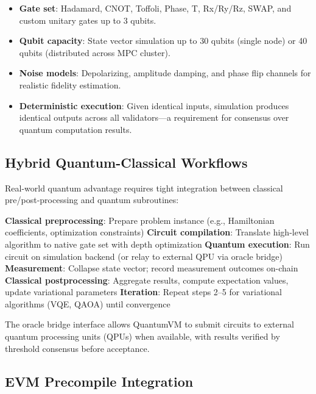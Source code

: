 \documentclass[11pt,letterpaper]{article}
\begin{document}
\begin{itemize}
\item \textbf{Gate set}: Hadamard, CNOT, Toffoli, Phase, T, Rx/Ry/Rz, SWAP, and custom unitary gates up to 3 qubits.
\item \textbf{Qubit capacity}: State vector simulation up to 30 qubits (single node) or 40 qubits (distributed across MPC cluster).
\item \textbf{Noise models}: Depolarizing, amplitude damping, and phase flip channels for realistic fidelity estimation.
\item \textbf{Deterministic execution}: Given identical inputs, simulation produces identical outputs across all validators---a requirement for consensus over quantum computation results.
\end{itemize}

\subsection{Hybrid Quantum-Classical Workflows}

Real-world quantum advantage requires tight integration between classical pre/post-processing and quantum subroutines:

\begin{algorithm}[H]
\caption{Hybrid Quantum-Classical Execution on QuantumVM}
\begin{algorithmic}[1]
\State \textbf{Classical preprocessing}: Prepare problem instance (e.g., Hamiltonian coefficients, optimization constraints)
\State \textbf{Circuit compilation}: Translate high-level algorithm to native gate set with depth optimization
\State \textbf{Quantum execution}: Run circuit on simulation backend (or relay to external QPU via oracle bridge)
\State \textbf{Measurement}: Collapse state vector; record measurement outcomes on-chain
\State \textbf{Classical postprocessing}: Aggregate results, compute expectation values, update variational parameters
\State \textbf{Iteration}: Repeat steps 2--5 for variational algorithms (VQE, QAOA) until convergence
\end{algorithmic}
\end{algorithm}

The oracle bridge interface allows QuantumVM to submit circuits to external quantum processing units (QPUs) when available, with results verified by threshold consensus before acceptance.

\subsection{EVM Precompile Integration}
\end{document}
